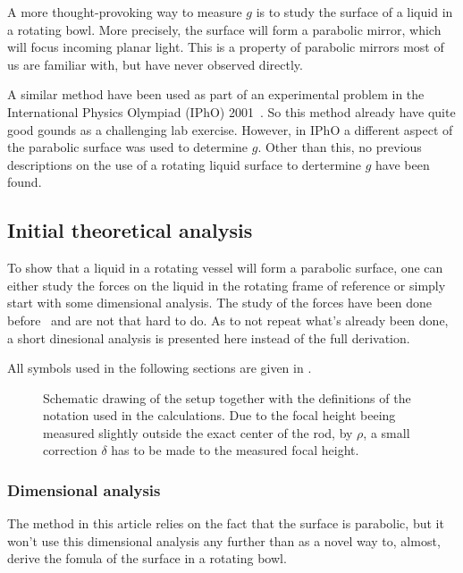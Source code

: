 \documentclass[11pt,towcolumn, swedish, english]{article}
\begin{document}
A more thought-provoking way to measure $g$ is to study the surface of
a liquid in a rotating bowl. More precisely, the surface will
form a parabolic mirror, which will focus incoming planar light. This
is a property of parabolic mirrors most of us are familiar with, but
have never observed directly. 

A similar method have been used as part of an experimental
problem in the International Physics Olympiad (IPhO\footnotemark{})
2001~\cite{IPhO2001}. So this method already have quite good gounds as
a challenging lab exercise. However, in IPhO a different aspect of the
parabolic surface was used to determine $g$. Other than this, no
previous descriptions on the use of a rotating liquid surface to
dertermine $g$ have been found.



\subsection{Initial theoretical analysis}
To show that a liquid in a rotating vessel will form a parabolic
surface, one can either study the forces on the liquid in the rotating
frame of reference or simply start with some dimensional analysis. The
study of the forces have been done before~\cite{Sabatka2010, Berg1990}
and are not that hard to do. As to not repeat what's already been
done, a short dinesional analysis is presented here instead of the
full derivation. 

All symbols used in the following sections are given in
. 

\begin{figure}\centering
\resizebox{.6\linewidth}{!}{}
\caption{Schematic drawing of the setup together with the definitions
  of the notation used in the calculations. Due to the focal height
  beeing measured slightly outside the exact center of the rod, by
  $\rho$, a small correction $\delta$ has to be made to the measured
  focal height.} 
\label{fig:rot_bowl} 
\end{figure}

\subsubsection{Dimensional analysis}
The method in this article relies on the fact that the surface is
parabolic, but it won't use this dimensional analysis any further than
as a novel way to, almost, derive the fomula of the surface in a
rotating bowl. 
\end{document}

